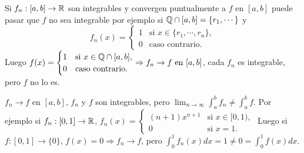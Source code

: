 \begin{note}
  Si $f_n: [a, b] \to \mathbb{R}$ son integrables y convergen puntualmente a $f$ en $[a, b]$ puede pasar que $f$ no sea integrable por ejemplo si $\mathbb{Q} \cap [a, b] = \{r_1, \cdots\}$ y
  \begin{equation}
    f_n(x) = \begin{cases}
      1 & \text{si } x \in \{r_1, \cdots, r_n\}, \\
      0 & \text{caso contrario}.
    \end{cases}
  \end{equation}
  Luego $f(x) = \begin{cases}
      1 & \text{si } x \in \mathbb{Q} \cap [a, b], \\
      0 & \text{caso contrario}.
    \end{cases} \Rightarrow f_n \to f \text{ en } [a, b]$, cada $f_n$ es integrable, pero $f$ no lo es.
\end{note}

\begin{note}
  $f_n \to f$ en $[a, b]$, $f_n$ y $f$ son integrables, pero $\lim_{n \to \infty} \int_a^b f_n \neq \int_a^b f$. Por ejemplo si $f_n: [0, 1] \to \mathbb{R}$, $f_n(x) = \begin{cases}
      (n+1) x^{n+1} & \text{si } x \in [0, 1), \\
      0             & \text{si } x = 1.
    \end{cases}$ Luego si $f: [0, 1] \to \{0\}$, $f(x) = 0 \Rightarrow f_n \to f$, pero $\int_0^1 f_n(x) dx = 1 \neq 0 = \int_0^1 f(x) dx$.
\end{note}
